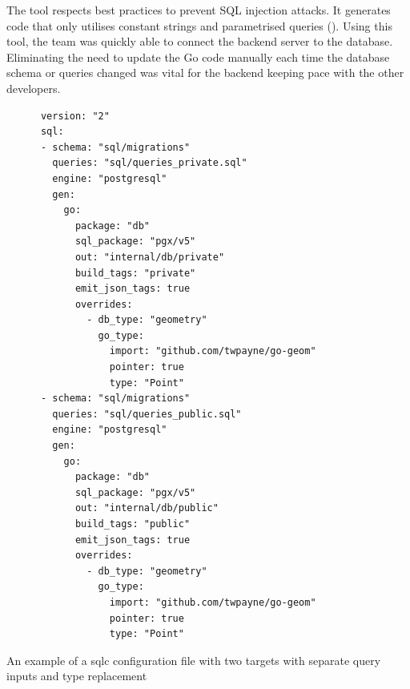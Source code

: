 The tool respects best practices to prevent SQL injection attacks. It generates
code that only utilises constant strings and parametrised queries
(\cite{sqlc_injection}). Using this tool, the team was quickly able to
connect the backend server to the database. Eliminating the need to update the
Go code manually each time the database schema or queries changed was vital for
the backend keeping pace with the other developers.

\begin{listing}[htbp]
  \centering{}
  \begin{minipage}{0.75\textwidth}
  \begin{verbatim}
      version: "2"
      sql:
      - schema: "sql/migrations"
        queries: "sql/queries_private.sql"
        engine: "postgresql"
        gen:
          go:
            package: "db"
            sql_package: "pgx/v5"
            out: "internal/db/private"
            build_tags: "private"
            emit_json_tags: true
            overrides:
              - db_type: "geometry"
                go_type:
                  import: "github.com/twpayne/go-geom"
                  pointer: true
                  type: "Point"
      - schema: "sql/migrations"
        queries: "sql/queries_public.sql"
        engine: "postgresql"
        gen:
          go:
            package: "db"
            sql_package: "pgx/v5"
            out: "internal/db/public"
            build_tags: "public"
            emit_json_tags: true
            overrides:
              - db_type: "geometry"
                go_type:
                  import: "github.com/twpayne/go-geom"
                  pointer: true
                  type: "Point"
  \end{verbatim}
  \end{minipage}
  \caption{An example of a sqlc configuration file with two targets with separate query inputs and type replacement}
  \label{listing:sqlc_config_file}
\end{listing}

\newpage{}

